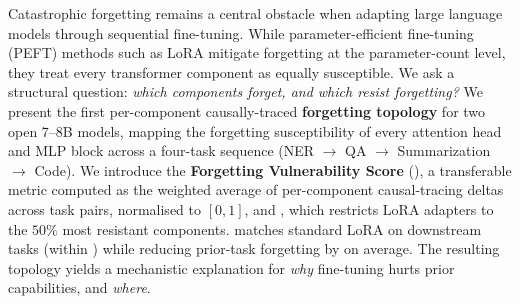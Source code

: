 Catastrophic forgetting remains a central obstacle when adapting large language models through sequential fine-tuning. While parameter-efficient fine-tuning (PEFT) methods such as LoRA \citep{hu2022lora} mitigate forgetting at the parameter-count level, they treat every transformer component as equally susceptible. We ask a structural question: \textit{which components forget, and which resist forgetting?} We present the first per-component causally-traced \textbf{forgetting topology} for two open 7--8B models, mapping the forgetting susceptibility of every attention head and MLP block across a four-task sequence (NER $\rightarrow$ QA $\rightarrow$ Summarization $\rightarrow$ Code). We introduce the \textbf{Forgetting Vulnerability Score} (\fvs{}), a transferable metric computed as the weighted average of per-component causal-tracing deltas across task pairs, normalised to $[0,1]$, and \textbf{\tglora{}}, which restricts LoRA adapters to the $50\%$ most resistant components. \tglora{} matches standard LoRA on downstream tasks (within ) while reducing prior-task forgetting by  on average. The resulting topology yields a mechanistic explanation for \textit{why} fine-tuning hurts prior capabilities, and \textit{where}.
